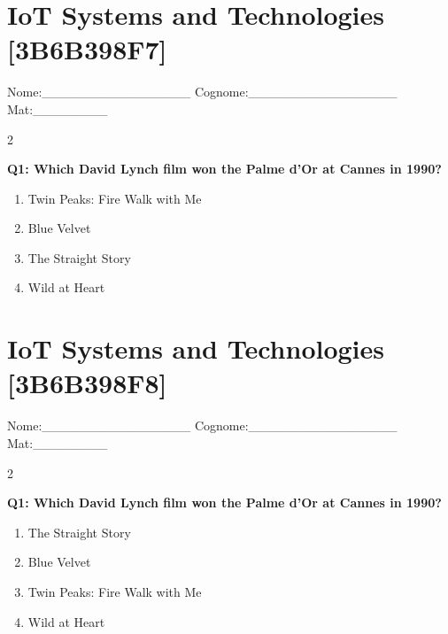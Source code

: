 \documentclass[10pt]{article}
\begin{document}
\newpage

\section*{IoT Systems and Technologies \footnotesize [3B6B398F7]}
{\footnotesize Nome:\_\_\_\_\_\_\_\_\_\_\_\_\_\_\_\_ Cognome:\_\_\_\_\_\_\_\_\_\_\_\_\_\_\_\_ Mat:\_\_\_\_\_\_\_\_}
\begin{multicols}{2}

\textbf{Q1: Which David Lynch film won the Palme d'Or at Cannes in 1990?}

\begin{enumerate}[label=\arabic*.]
\item Twin Peaks: Fire Walk with Me
\item Blue Velvet
\item The Straight Story
\item Wild at Heart
\end{enumerate}
\end{multicols}

\newpage

\section*{IoT Systems and Technologies \footnotesize [3B6B398F8]}
{\footnotesize Nome:\_\_\_\_\_\_\_\_\_\_\_\_\_\_\_\_ Cognome:\_\_\_\_\_\_\_\_\_\_\_\_\_\_\_\_ Mat:\_\_\_\_\_\_\_\_}
\begin{multicols}{2}

\textbf{Q1: Which David Lynch film won the Palme d'Or at Cannes in 1990?}

\begin{enumerate}[label=\arabic*.]
\item The Straight Story
\item Blue Velvet
\item Twin Peaks: Fire Walk with Me
\item Wild at Heart
\end{enumerate}
\end{multicols}
\end{document}
